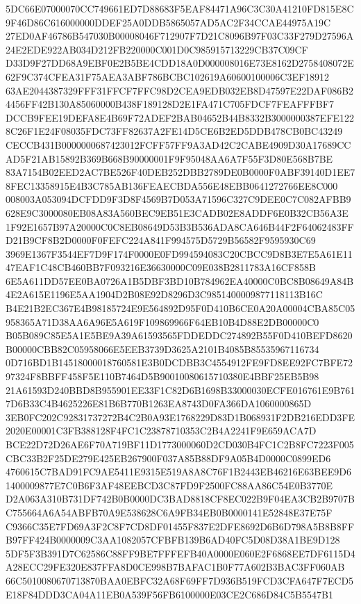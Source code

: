 \documentclass[UTF8,fontset=fandol,zihao=-4,a4paper]{ctexart}
\begin{document}
{{5DC66E07000070CC749661ED7D88683F5EAF84471A96C3C30A41210FD815E8C9F46D86C616000000DDEF25A0DDB5865057AD5AC2F34CCAE44975A19C
27ED0AF46786B547030B00008046F712907F7D21C8096B97F03C33F279D27596A24E2EDE922AB034D212FB220000C001D0C985915713229CB37C09CF
D33D9F27DD68A9EBF0E2B5BE4CDD18A0D000008016E73E8162D2758408072E62F9C374CFEA31F75AEA3ABF786BCBC102619A60600100006C3EF18912
63AE2044387329FFF31FFCF7FFC98D2CEA9EDB032EB8D47597E22DAF086B24456FF42B130A85060000B438F189128D2E1FA471C705FDCF7FEAFFFBF7
DCCB9FEE19DEFA8E4B69F72ADEF2BAB04652B44B8332B3000000387EFE1228C26F1E24F08035FDC73FF82637A2FE14D5CE6B2ED5DDB478CB0BC43249
CECCB431B0000000687423012FCFF57FF9A3AD42C2CABE4909D30A17689CCAD5F21AB15892B369B668B90000001F9F95048AA6A7F55F3D80E568B7BE
83A7154B02EED2AC7BE526F40DEB252DBB2789DE0B0000F0ABF39140D1EE78FEC13358915E4B3C785AB136FEAECBDA556E48EBB0641272766EE8C000
008003A053094DCFDD9F3D8F4569B7D053A71596C327C9DEE0C7C082AFBB9628E9C3000080EB08A83A560BEC9EB51E3CADB02E8ADDF6E0B32CB56A3E
1F92E1657B97A20000C0C8EB08649D53B3B536ADA8CA646B44F2F64062483FFD21B9CF8B2D0000F0FEFC224A841F994575D5729B56582F9595930C69
3969E1367F3544EF7D9F174F0000E0FD994594083C20CBCC9D8B3E7E5A61E1147EAF1C48CB460BB7F093216E36630000C09E038B2811783A16CF858B
6E5A611DD57EE0BA0726A1B5DBF3BD10B784962EA40000C0BC8B08649A84B4E2A615E1196E5AA1904D2B08E92D8296D3C9851400009877118113B16C
B4E21B2EC367E4B98185724E9E564892D95F0D410B6CE0A20A00004CBA85C05958365A71D38AA6A96E5A619F109869966F64EB10B4D88E2DB00000C0
B05B089C85E5A1E5BE9A39A61593565FDDEDDC274892B55F0D410BEFD8620B00000CBB82C05958066E5EEB3739D3625A2101B4085B85535967116734
0D716BD1B14518000018760581E3B0DCDBB3C4554912FE9FD8EE92FC7BFE7297324F8BBFF458F5E110B7464D5B90010080615710380E4BBF25EB5B98
21A61593D240BBD8B955901EE33F1C82D6B1698B33000030ECFE016761E9B7617D6B33C4B4625226E81B6B770B1263EA8743D0FA366DA1060000865D
3EB0FC202C92831737272B4C2B0A93E1768229D83D1B068931F2DB216EDD3FE2020E00001C3FB388128F4FC1C23878710353C2B4A2241F9E659ACA7D
BCE22D72D26AE6F70A719BF11D1773000060D2CD030B4FC1C2B8FC7223F005CBC33B2F25DE279E425EB267900F037A85B88DF9A05B4D0000C0899ED6
4760615C7BAD91FC9AE5411E9315E519A8A8C76F1B2443EB46216E63BEE9D61400009877E7C0B6F3AF48EEBCD3C87FD9F2500FC88AA86C54E0B3770E
D2A063A310B731DF742B0B0000DC3BAD8818CF8EC022B9F04EA3CB2B9707BC755664A6A54ABFB70A9E538628C6A9FB34EB0B0000141E52848E37E75F
C9366C35E7FD69A3F2C8F7CD8DF01455F837E2DFE8692D6B6D798A5B8B8FFB97FF424B0000009C3AA1082057CFBFB139B6AD40FC5D08D38A1BE9D128
5DF5F3B391D7C62586C88FF9BE7FFFEFB40A0000E060E2F6868EE7DF6115D4A28ECC29FE320E837FFA8D0CE998B7BAFAC1B0F77A602B3BAC3FF060AB
66C5010080670713870BAA0EBFC32A68F69FF7D936B519FCD3CFA647F7ECD5E18F84DDD3CA04A11EB0A539F56FB6100000E03CE2C686D84C5B5547B1
}}
\end{document}
